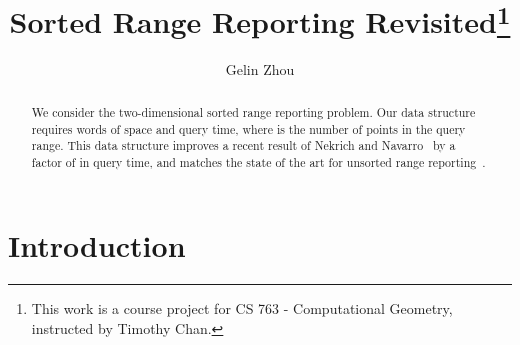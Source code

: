 \documentclass{llncs}
\begin{document}
\title{Sorted Range Reporting Revisited\thanks{This work is a course project for CS 763 - Computational Geometry, instructed by Timothy Chan.}}

\author{Gelin Zhou}

\maketitle



\begin{abstract}
    We consider the two-dimensional sorted range reporting problem.
    Our data structure requires  words of space and  query time,
    where  is the number of points in the query range.
    This data structure improves a recent result of Nekrich and Navarro~\cite{DBLP:conf/swat/NekrichN12} by a factor of  in query time,
    and matches the state of the art for unsorted range reporting~\cite{DBLP:conf/compgeom/ChanLP11}.
\end{abstract}

\section{Introduction}
\end{document}

